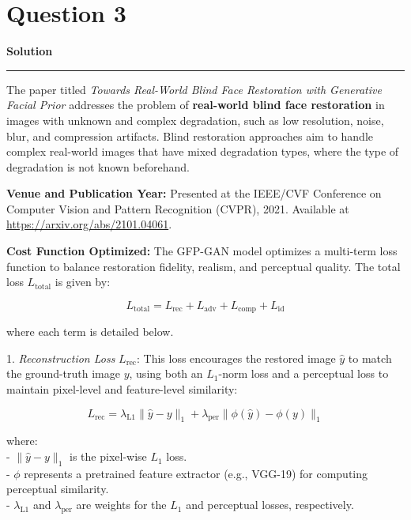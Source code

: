 \documentclass[a4paper,12pt]{article}
\title{\cooltitle{CS663 Assignment-5}}
\author{{\bf Saksham Rathi, Kavya Gupta, Shravan Srinivasa Raghavan} \\
\small Department of Computer Science, \\
Indian Institute of Technology Bombay \\}
\date{}
\newenvironment{solution}[2][]{%
    \begin{mdframed}[linecolor=blue!70!black, linewidth=2pt, roundcorner=10pt, backgroundcolor=yellow!10!white, skipabove=12pt, skipbelow=12pt]%
        \textbf{\large #2}
        \par\noindent\rule{\textwidth}{0.4pt}
}{
    \end{mdframed}
}
\begin{document}
\maketitle

\section*{Question 3}
\begin{solution}{Solution}
	The paper titled \textit{Towards Real-World Blind Face Restoration with Generative Facial Prior} addresses the problem of \textbf{real-world blind face restoration} in images with unknown and complex degradation, such as low resolution, noise, blur, and compression artifacts. Blind restoration approaches aim to handle complex real-world images that have mixed degradation types, where the type of degradation is not known beforehand.

\textbf{Venue and Publication Year:} Presented at the IEEE/CVF Conference on Computer Vision and Pattern Recognition (CVPR), 2021. Available at \url{https://arxiv.org/abs/2101.04061}.

\textbf{Cost Function Optimized:} The GFP-GAN model optimizes a multi-term loss function to balance restoration fidelity, realism, and perceptual quality. The total loss \( L_{\text{total}} \) is given by:

\[
L_{\text{total}} = L_{\text{rec}} + L_{\text{adv}} + L_{\text{comp}} + L_{\text{id}}
\]

where each term is detailed below.

1. \textit{Reconstruction Loss} \( L_{\text{rec}} \): This loss encourages the restored image \( \hat{y} \) to match the ground-truth image \( y \), using both an \( L_1 \)-norm loss and a perceptual loss to maintain pixel-level and feature-level similarity:

   \[
   L_{\text{rec}} = \lambda_{\text{L1}} \| \hat{y} - y \|_1 + \lambda_{\text{per}} \| \phi(\hat{y}) - \phi(y) \|_1
   \]

   where: \\
   - \( \| \hat{y} - y \|_1 \) is the pixel-wise \( L_1 \) loss. \\
   - \( \phi \) represents a pretrained feature extractor (e.g., VGG-19) for computing perceptual similarity. \\
   - \( \lambda_{\text{L1}} \) and \( \lambda_{\text{per}} \) are weights for the \( L_1 \) and perceptual losses, respectively. \\


\end{solution}
\end{document}
